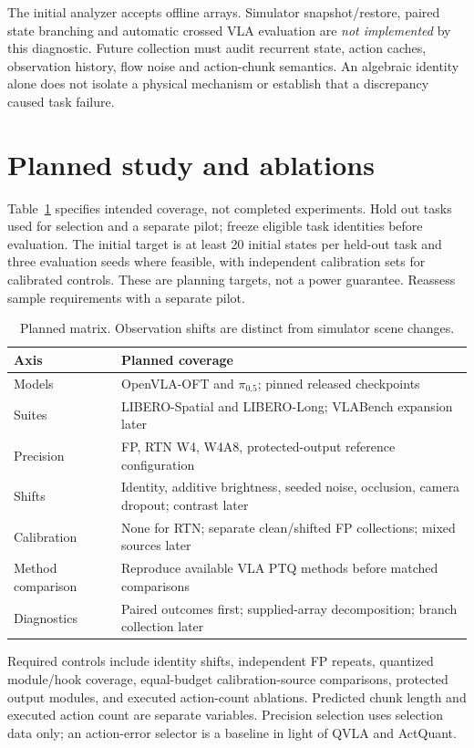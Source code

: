 \documentclass[11pt]{article}
\begin{document}
The initial analyzer accepts offline arrays. Simulator snapshot/restore, paired
state branching and automatic crossed VLA evaluation are \emph{not implemented}
by this diagnostic. Future collection must audit recurrent state, action caches,
observation history, flow noise and action-chunk semantics. An algebraic identity
alone does not isolate a physical mechanism or establish that a discrepancy
caused task failure.

\section{Planned study and ablations}
Table~\ref{tab:plan} specifies intended coverage, not completed experiments.
Hold out tasks used for selection and a separate pilot; freeze eligible task
identities before evaluation. The initial target is at least 20 initial states
per held-out task and three evaluation seeds where feasible, with independent
calibration sets for calibrated controls. These are planning targets, not a power
guarantee. Reassess sample requirements with a separate pilot.

\begin{table}[ht]
\centering\small
\begin{tabularx}{\linewidth}{lX}
\toprule
Axis & Planned coverage \\
\midrule
Models & OpenVLA-OFT and $\pi_{0.5}$; pinned released checkpoints \\
Suites & LIBERO-Spatial and LIBERO-Long; VLABench expansion later \\
Precision & FP, RTN W4, W4A8, protected-output reference configuration \\
Shifts & Identity, additive brightness, seeded noise, occlusion, camera dropout; contrast later \\
Calibration & None for RTN; separate clean/shifted FP collections; mixed sources later \\
Method comparison & Reproduce available VLA PTQ methods before matched comparisons \\
Diagnostics & Paired outcomes first; supplied-array decomposition; branch collection later \\
\bottomrule
\end{tabularx}
\caption{Planned matrix. Observation shifts are distinct from simulator scene changes.}
\label{tab:plan}
\end{table}

Required controls include identity shifts, independent FP repeats, quantized
module/hook coverage, equal-budget calibration-source comparisons, protected
output modules, and executed action-count ablations. Predicted chunk length and
executed action count are separate variables. Precision selection uses selection
data only; an action-error selector is a baseline in light of QVLA and ActQuant.
\end{document}
